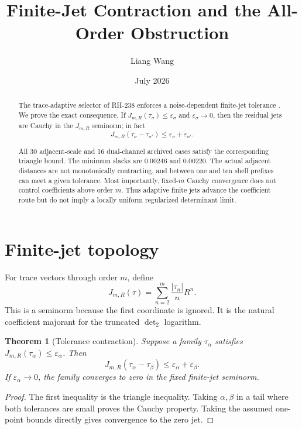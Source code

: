 \documentclass[11pt]{article}
\title{Finite-Jet Contraction and the All-Order Obstruction}
\author{Liang Wang}
\date{July 2026}
\newtheorem{theorem}{Theorem}[section]
\theoremstyle{remark}
\begin{document}
\maketitle

\begin{abstract}
The trace-adaptive selector of RH-238 enforces a noise-dependent finite-jet
tolerance \citep{WangRH238}.  We prove the exact consequence.  If
$J_{m,R}(\tau_\sigma)\le\varepsilon_\sigma$ and
$\varepsilon_\sigma\to0$, then the residual jets are Cauchy in the
$J_{m,R}$ seminorm; in fact
\[
 J_{m,R}(\tau_\sigma-\tau_{\sigma'})
 \le\varepsilon_\sigma+\varepsilon_{\sigma'}.
\]

All 30 adjacent-scale and 16 dual-channel archived cases satisfy the
corresponding triangle bound.  The minimum slacks are $0.00246$ and $0.00220$.
The actual adjacent distances are not monotonically contracting, and between
one and ten shell prefixes can meet a given tolerance.  Most importantly,
fixed-$m$ Cauchy convergence does not control coefficients above order $m$.
Thus adaptive finite jets advance the coefficient route but do not imply a
locally uniform regularized determinant limit.
\end{abstract}

\section{Finite-jet topology}

For trace vectors through order $m$, define
\[
 J_{m,R}(\tau)=\sum_{n=2}^m\frac{|\tau_n|}{n}R^n.
\]
This is a seminorm because the first coordinate is ignored.  It is the
natural coefficient majorant for the truncated $\det_2$ logarithm.

\begin{theorem}[Tolerance contraction]\label{thm:contraction}
Suppose a family $\tau_\alpha$ satisfies
$J_{m,R}(\tau_\alpha)\le\varepsilon_\alpha$.  Then
\[
 J_{m,R}(\tau_\alpha-\tau_\beta)
 \le\varepsilon_\alpha+\varepsilon_\beta.
\]
If $\varepsilon_\alpha\to0$, the family converges to zero in the fixed
finite-jet seminorm.
\end{theorem}

\begin{proof}
The first inequality is the triangle inequality.  Taking $\alpha,\beta$ in a
tail where both tolerances are small proves the Cauchy property.  Taking
the assumed one-point bounds directly gives convergence to the zero jet.
\end{proof}
\end{document}
